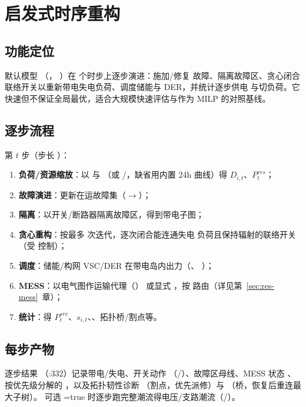 \section{启发式时序重构}\label{sec:res-heuristic}

\subsection{功能定位}
默认模型 （，
）在  个时步上逐步演进：施加/修复
故障、隔离故障区、贪心闭合联络开关以重新带电失电负荷、调度储能与 DER，并统计逐步供电
与切负荷。它快速但不保证全局最优，适合大规模快速评估与作为 MILP 的对照基线。

\subsection{逐步流程}
第 $t$ 步（步长 ）：
\begin{enumerate}
  \item \textbf{负荷/资源缩放}：以  与 
        （或 /，缺省用内置 24h 曲线）得 $D_{i,t}$、$P^{res}_t$；
  \item \textbf{故障演进}：更新在运故障集（$\to$）；
  \item \textbf{隔离}：以开关/断路器隔离故障区，得到带电子图；
  \item \textbf{贪心重构}：按最多  次迭代，逐次闭合能连通失电
        负荷且保持辐射的联络开关（受  控制）；
  \item \textbf{调度}：储能/构网 VSC/DER 在带电岛内出力（、
        ）；
  \item \textbf{MESS}：以电气图作运输代理（）
        或显式 ，按  路由（详见第~\ref{sec:res-mess}~章）；
  \item \textbf{统计}：得 $P_t^{srv}$、$s_{i,t}$、、拓扑桥/割点等。
\end{enumerate}

\subsection{每步产物}
逐步结果 （:332）记录带电/失电、开关动作
（/）、故障区母线、MESS 状态
、按优先级分解的 ，以及拓扑韧性诊断
（割点，优先派修）与 （桥，恢复后重连最大子树）。
可选 =true 时逐步跑完整潮流得电压/支路潮流（/）。
